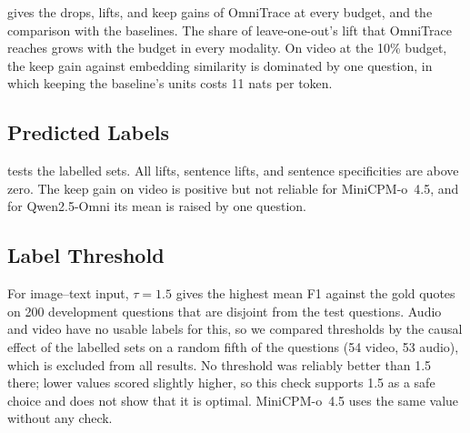 \begin{table}[t]
\centering
\small
\setlength{\tabcolsep}{4pt}
\resizebox{\textwidth}{!}{}
\caption{Lift of every method at every budget on Qwen2.5-Omni-7B, and the paired difference between OmniTrace and each baseline with its 95\% bootstrap interval. OT-trained: OmniTrace-trained ().}
\label{tab:budget_base}
\end{table}

 gives the drops, lifts, and keep gains of OmniTrace at every budget, and  the comparison with the baselines.
The share of leave-one-out's lift that OmniTrace reaches grows with the budget in every modality.
On video at the 10\% budget, the keep gain against embedding similarity is dominated by one question, in which keeping the baseline's units costs 11 nats per token.

\subsection{Predicted Labels}
\label{appendix:labels}

\begin{table}[t]
\centering
\small
\setlength{\tabcolsep}{4pt}
\resizebox{\textwidth}{!}{}
\caption{Causal test of the labels of  at $\tau=1.5$. Units labelled: mean number per response and share of the candidate units. No label: responses whose response-level label is empty. Lift and keep gain compare the labelled units with random units of the same count.}
\label{tab:labels}
\end{table}

 tests the labelled sets.
All lifts, sentence lifts, and sentence specificities are above zero.
The keep gain on video is positive but not reliable for MiniCPM-o~4.5, and for Qwen2.5-Omni its mean is raised by one question.

\subsection{Label Threshold}
\label{appendix:threshold}

For image--text input, $\tau=1.5$ gives the highest mean F1 against the gold quotes on 200 development questions that are disjoint from the test questions.
Audio and video have no usable labels for this, so we compared thresholds by the causal effect of the labelled sets on a random fifth of the questions (54 video, 53 audio), which is excluded from all results.
No threshold was reliably better than 1.5 there; lower values scored slightly higher, so this check supports 1.5 as a safe choice and does not show that it is optimal.
MiniCPM-o~4.5 uses the same value without any check.

